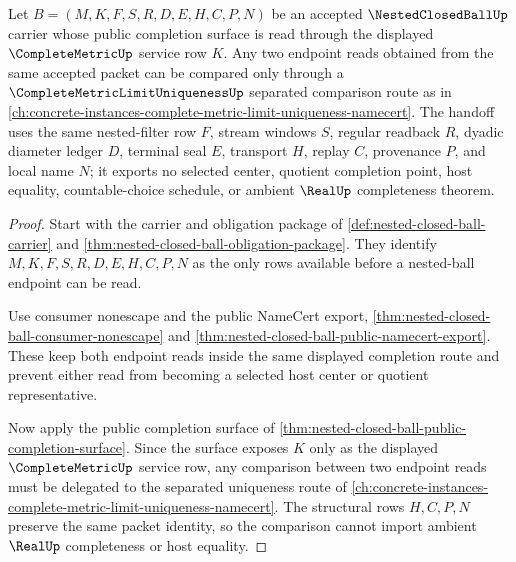 \begin{theorem}
\label{thm:nested-closed-ball-separated-uniqueness-handoff}
Let $B=(M,K,F,S,R,D,E,H,C,P,N)$ be an accepted $\NestedClosedBallUp$ carrier whose public completion surface is read through the displayed $\CompleteMetricUp$ service row $K$. Any two endpoint reads obtained from the same accepted packet can be compared only through a $\CompleteMetricLimitUniquenessUp$ separated comparison route as in \autoref{ch:concrete-instances-complete-metric-limit-uniqueness-namecert}. The handoff uses the same nested-filter row $F$, stream windows $S$, regular readback $R$, dyadic diameter ledger $D$, terminal seal $E$, transport $H$, replay $C$, provenance $P$, and local name $N$; it exports no selected center, quotient completion point, host equality, countable-choice schedule, or ambient $\RealUp$ completeness theorem.
\end{theorem}
\begin{proof}
Start with the carrier and obligation package of \autoref{def:nested-closed-ball-carrier} and \autoref{thm:nested-closed-ball-obligation-package}. They identify $M,K,F,S,R,D,E,H,C,P,N$ as the only rows available before a nested-ball endpoint can be read.

Use consumer nonescape and the public NameCert export, \autoref{thm:nested-closed-ball-consumer-nonescape} and \autoref{thm:nested-closed-ball-public-namecert-export}. These keep both endpoint reads inside the same displayed completion route and prevent either read from becoming a selected host center or quotient representative.

Now apply the public completion surface of \autoref{thm:nested-closed-ball-public-completion-surface}. Since the surface exposes $K$ only as the displayed $\CompleteMetricUp$ service row, any comparison between two endpoint reads must be delegated to the separated uniqueness route of \autoref{ch:concrete-instances-complete-metric-limit-uniqueness-namecert}. The structural rows $H,C,P,N$ preserve the same packet identity, so the comparison cannot import ambient $\RealUp$ completeness or host equality.
\end{proof}


